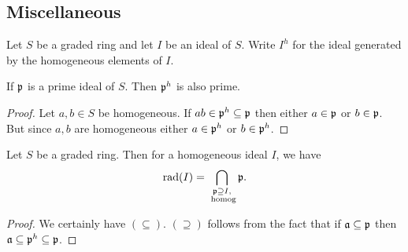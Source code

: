 \documentclass{memoir}
\begin{document}
\subsection{Miscellaneous}
\begin{definition}
    Let $S$ be a graded ring and let $I$ be an ideal of $S$.
    Write $I^h$ for the ideal generated by the homogeneous elements of $I$.
\end{definition}
\begin{proposition}
    If $\mathfrak{p}$ is a prime ideal of $S$. 
    Then $\mathfrak{p}^h$ is also prime.
\end{proposition}
\begin{proof}
    Let $a,b\in S$ be homogeneous.
    If $ab\in \mathfrak{p}^h\subseteq \mathfrak{p}$ then either $a\in\mathfrak{p}$ or $b\in\mathfrak{p}$.
    But since $a,b$ are homogeneous either $a\in\mathfrak{p}^h$ or $b\in\mathfrak{p}^h$.
\end{proof}
\begin{corollary}
    Let $S$ be a graded ring.
    Then for a homogeneous ideal $I$, we have 
    \begin{equation}
        \text{rad}(I) = \bigcap_{\substack{\mathfrak{p}\supseteq I, \\\text{ homog}}} \mathfrak{p}.
    \end{equation}
\end{corollary}
\begin{proof}
    We certainly have $(\subseteq)$.
    $(\supseteq)$ follows from the fact that if $\mathfrak{a}\subseteq \mathfrak{p}$ then $\mathfrak{a} \subseteq \mathfrak{p}^h\subseteq \mathfrak{p}$.
\end{proof}
\end{document}
